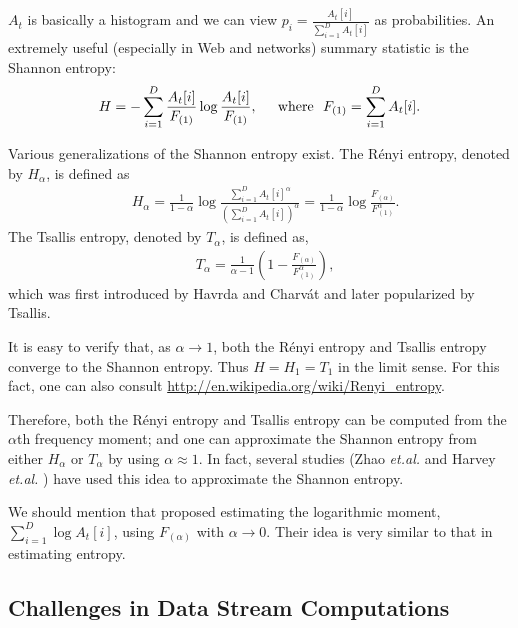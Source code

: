 \documentclass{sig-alternate}
\begin{document}
$A_t$ is basically a histogram and we can view $p_i = \frac{A_t[i]}{\sum_{i=1}^D A_t[i]}$ as probabilities. An extremely useful (especially in Web and networks\cite{Proc:Zhao_IMC07,Proc:Mei_WSDM08}) summary statistic is the Shannon entropy:
\begin{align}\label{eqn_Shannon}
H = -\sum_{i=1}^D\frac{A_t[i]}{F_{(1)}}\log \frac{A_t[i]}{F_{(1)}}, \hspace{0.2in} \text{where} \ \ F_{(1)} = \sum_{i=1}^D A_t[i].
\end{align}

Various generalizations of the Shannon entropy exist. The R\'enyi entropy\cite{Proc:Renyi_61}, denoted by $H_\alpha$, is defined as
\begin{align}\label{eqn_Renyi}
&H_\alpha =\frac{1}{1-\alpha} \log \frac{\sum_{i=1}^D A_t[i]^\alpha}{\left(\sum_{i=1}^D A_t[i]\right)^\alpha} = \frac{1}{1-\alpha} \log \frac{F_{(\alpha)}}{F_{(1)}^\alpha}.
\end{align}
The Tsallis entropy\cite{Article:Havrda_67,Article:Tsallis_88}, denoted by $T_\alpha$,  is defined as,
\begin{align}\label{eqn_Tsallis}
&T_\alpha = \frac{1}{\alpha -1} \left( 1 - \frac{F_{(\alpha)}}{F_{(1)}^\alpha}\right),
\end{align}
\noindent which was first introduced by Havrda and Charv\'at\cite{Article:Havrda_67} and later popularized by Tsallis\cite{Article:Tsallis_88}.

It is easy to verify that, as $\alpha\rightarrow 1$, both the R\'enyi entropy and Tsallis entropy  converge to the Shannon entropy. Thus $H = H_1 = T_1$ in the limit sense. For this fact, one can also consult \url{http://en.wikipedia.org/wiki/Renyi_entropy}.

Therefore, both the R\'enyi entropy and Tsallis entropy can be computed from the $\alpha$th frequency moment; and one can approximate the Shannon entropy from either $H_\alpha$ or $T_\alpha$ by using $\alpha\approx 1$. In fact, several studies (Zhao {\em et.al.} \cite{Proc:Zhao_IMC07} and Harvey {\em et.al.} \cite{Article:Harvey_entropy_arXiv08,Proc:Harvey_FOCS08})   have used this idea to approximate the Shannon entropy. 

We should mention that \cite{Article:Li_CC} proposed estimating the logarithmic moment, $\sum_{i=1}^D \log A_t[i]$, using $F_{(\alpha)}$ with $\alpha\rightarrow 0$. Their idea is very similar to that in estimating entropy. 


\subsection{Challenges in Data Stream Computations}
\end{document}
